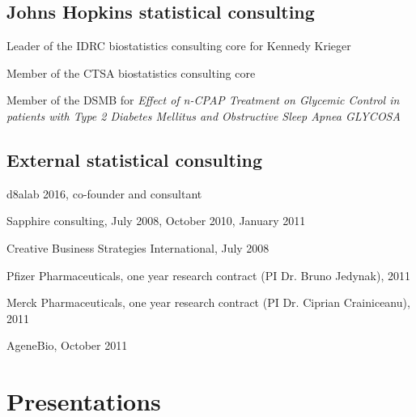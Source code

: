 \documentclass[12pt]{article}
\begin{document}
\subsection*{Johns Hopkins statistical consulting}
\begin{description}
\item Leader of the IDRC biostatistics consulting core for Kennedy Krieger 
\item Member of the CTSA biostatistics consulting core  
\item Member of the DSMB for {\it Effect of n-CPAP Treatment on Glycemic Control  in patients with  Type 2 
Diabetes Mellitus and Obstructive Sleep Apnea GLYCOSA}
\end{description}

\subsection*{External statistical consulting}
\begin{description}
\item d8alab 2016, co-founder and consultant
\item Sapphire consulting, July 2008, October 2010, January 2011 
\item Creative Business Strategies International, July 2008
\item Pfizer Pharmaceuticals, one year research contract (PI Dr. Bruno Jedynak), 2011
\item Merck Pharmaceuticals, one year research contract (PI Dr. Ciprian Crainiceanu), 2011
\item AgeneBio, October 2011
\end{description}
\section*{Presentations}
\end{document}
